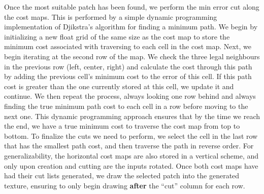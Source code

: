 \documentclass[a4paper, 11pt, titlepage]{article}
\begin{document}
Once the most suitable patch has been found, we perform the min error cut along
the cost maps. This is performed by a simple dynamic programming implementation
of Djikstra's algorithm for finding a minimum path. We begin by initializing a
new float grid of the same size as the cost map to store the minimum cost
associated with traversing to each cell in the cost map. Next, we begin
iterating at the second row of the map. We check the three legal neighbours in
the previous row (left, center, right) and calculate the cost through this path
by adding the previous cell's minimum cost to the error of this cell. If this
path cost is greater than the one currently stored at this cell, we update it
and continue. We then repeat the process, always looking one row behind and
always finding the true minimum path cost to each cell in a row before moving to
the next one. This dynamic programming approach ensures that by the time we
reach the end, we have a true minimum cost to traverse the cost map from top to
bottom. To finalize the cuts we need to perform, we select the cell in the
last row that has the smallest path cost, and then traverse the path in reverse
order. For generalizability, the horizontal cost maps are also stored in a
vertical scheme, and only upon creation and cutting are the inputs rotated. Once
both cost maps have had their cut lists generated, we draw the selected patch
into the generated texture, ensuring to only begin drawing \textbf{after} the
``cut'' column for each row.
\end{document}
